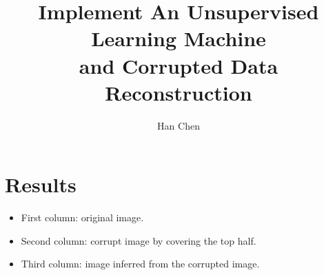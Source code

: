 \documentclass[a4paper,onecolumn]{article}
\theoremstyle{remark}
\begin{document}
\setcounter{page}{1}

\title{Implement An Unsupervised Learning Machine \\ and Corrupted Data Reconstruction}
\author{Han Chen}
\maketitle

\section{Results}
\begin{itemize}
    \item First column: original image. 
    \item Second column: corrupt image by covering the top half.
    \item Third column: image inferred from the corrupted image.
\end{itemize}
\end{document}
